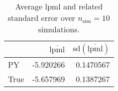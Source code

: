 \begin{table}[H]

\caption{Average lpml and related standard error over $n_{\text{sim}} = 10$ simulations.}
\centering
\begin{tabular}[t]{lrr}
\toprule
  & $\overbar{\text{lpml}}$ & $\text{sd}(\overbar{\text{lpml}})$\\
\midrule
PY & -5.920266 & 0.1470567\\
True & -5.657969 & 0.1387267\\
\bottomrule
\end{tabular}
\end{table}